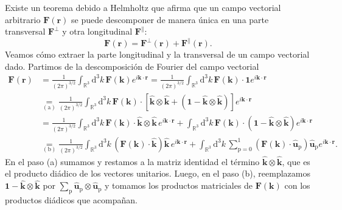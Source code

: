Existe un teorema debido a Helmholtz que afirma que un campo vectorial arbitrario \(\mathbf{F}(\mathbf{r})\) se puede descomponer de manera única en una parte transversal \(\mathbf{F}^\perp\) y otra longitudinal \(\mathbf{F}^\parallel\):
\begin{equation}
    \mathbf{F}(\mathbf{r}) = \mathbf{F}^{\perp}(\mathbf{r}) + \mathbf{F}^{\parallel}(\mathbf{r}).
\end{equation}
Veamos cómo extraer la parte longitudinal y la transversal de un campo vectorial dado. Partimos de la descomposición de Fourier del campo vectorial
\begin{align*}
    \mathbf{F}(\mathbf{r}) &= \frac{1}{(2\pi)^{3/2}}\int_{\mathbb{R}^3}\mathrm{d}^3k\, \mathbf{F}(\mathbf{k}) e^{i\mathbf{k}\cdot \mathbf{r}} = \frac{1}{(2\pi)^{3/2}}\int_{\mathbb{R}^3}\mathrm{d}^3k\, \mathbf{F}(\mathbf{k})\cdot \mathbf{1} e^{i\mathbf{k}\cdot \mathbf{r}} \\
    &\underset{\mathrm{(a)}}{=} \frac{1}{(2\pi)^{3/2}}\int_{\mathbb{R}^3}\mathrm{d}^3k\, \mathbf{F}(\mathbf{k}) \cdot \left[\hat{\mathbf{k}}\otimes\hat{\mathbf{k}} + \left(\mathbf{1} - \hat{\mathbf{k}}\otimes\hat{\mathbf{k}}\right)\right]e^{i\mathbf{k}\cdot \mathbf{r}}\\
    &= \frac{1}{(2\pi)^{3/2}}\int_{\mathbb{R}^3}\mathrm{d}^3k\, \mathbf{F}(\mathbf{k}) \cdot\hat{\mathbf{k}}\otimes\hat{\mathbf{k}}\, e^{i\mathbf{k}\cdot \mathbf{r}} + \int_{\mathbb{R}^3}\mathrm{d}^3k\, \mathbf{F}(\mathbf{k}) \cdot\left(\mathbf{1} - \hat{\mathbf{k}}\otimes\hat{\mathbf{k}}\right)e^{i\mathbf{k}\cdot \mathbf{r}}\\
    &\underset{\mathrm{(b)}}{=} \frac{1}{(2\pi)^{3/2}}\int_{\mathbb{R}^3}\mathrm{d}^3k\, \left(\mathbf{F}(\mathbf{k}) \cdot\hat{\mathbf{k}}\right)\hat{\mathbf{k}}\, e^{i\mathbf{k}\cdot \mathbf{r}} + \int_{\mathbb{R}^3}\mathrm{d}^3k\, \sum_{\mathrm{p}=0}^1 \left(\mathbf{F}(\mathbf{k}) \cdot\hat{\mathbf{u}}_\mathrm{p}\right) \hat{\mathbf{u}}_\mathrm{p} e^{i\mathbf{k}\cdot \mathbf{r}}.
\end{align*}
En el paso (a) sumamos y restamos a la matriz identidad el término \(\hat{\mathbf{k}}\otimes\hat{\mathbf{k}}\), que es el producto diádico de los vectores unitarios.  Luego, en el paso (b), reemplazamos \(\mathbf{1}-\hat{\mathbf{k}}\otimes\hat{\mathbf{k}}\) por \(\sum_\mathrm{p}\hat{\mathbf{u}}_\mathrm{p}\otimes\hat{\mathbf{u}}_\mathrm{p}\) y tomamos los productos matriciales de \(\mathbf{F}(\mathbf{k})\) con los productos diádicos que acompañan.

